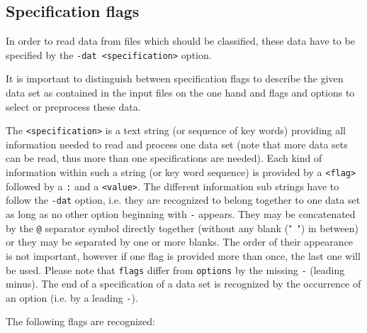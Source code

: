 \documentclass[12pt, oneside, a4paper, headsepline, plainheadsepline]{scrbook}
\begin{document}
\subsection{Specification flags}

In order to read data from files which should be classified, these
data have to be specified by the \verb+-dat <specification>+ option.

It is important to distinguish between specification flags to describe the given data set as contained in the input files on the one hand and 
flags and options to select or preprocess these data.

The \verb+<specification>+ is a text string (or sequence of key words) providing all information
needed to read and process one data set (note that more data sets can be read, thus more than one specifications are needed). 
Each kind of information
within such a string (or key word sequence) is provided by a \verb+<flag>+ followed by a \verb+:+
and a \verb+<value>+. The different information sub strings have to follow the \verb+-dat+ option,
i.e. they are recognized to belong together to one data set as long as no other option beginning with
\verb+-+ appears. They may be concatenated by the \verb+@+ separator symbol directly together (without any blank ("\verb+ +") in between) 
or they may be separated by one or more blanks. The order of their appearance 
is not important, however if one flag is provided more than once, the last one will be used.
Please note that \verb+flags+ differ from \verb+options+ by the missing \verb+-+ (leading minus). 
The end of a specification of a data set is recognized by the occurrence of an option (i.e. by a leading \verb+-+).


The following flags are recognized:

\end{document}
